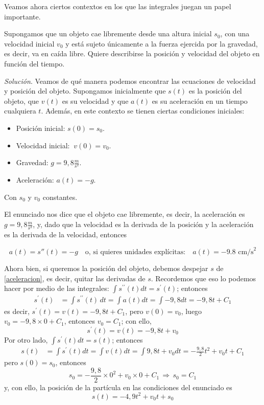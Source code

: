 Veamos ahora ciertos contextos en los que las integrales juegan un papel importante.

\begin{ejemplo}
\textnormal{Supongamos que un objeto cae libremente desde una altura inicial \textit{$s_{0}$}, con una velocidad inicial \textit{$v_{0}$} y está sujeto únicamente a la fuerza ejercida por la gravedad, es decir, va en caída libre. Quiere describirse la posición y velocidad del objeto en función del tiempo.}
\end{ejemplo}

\textit{Solución}. Veamos de qué manera podemos encontrar las ecuaciones de velocidad y posición del objeto. Supongamos inicialmente que $s(t)$ es la posición del objeto, que $v(t)$ es su velocidad y que $a(t)$ es su aceleración en un tiempo cualquiera $t$. Además, en este contexto se tienen ciertas condiciones iniciales:

\begin{itemize}
 \item Posición inicial: $s(0)=s_{0}$.
 \item Velocidad inicial: $\ v(0)=v_{0}$.
 \item Gravedad: $g=9,8\frac{m}{s^{2}}$.
 \item Aceleración: $a(t)=-g$.
\end{itemize}
Con $s_0$ y $v_0$ constantes.


El enunciado nos dice que el objeto cae libremente, es decir, la aceleración es $g=9,8\frac{m}{s^{2}}$, y, dado que la velocidad es la derivada de la posición y la aceleración es la derivada de la velocidad, entonces

{\small
\begin{equation}\label{aceleracion}
	a(t)=s''(t)=-g \quad \text{o, si quieres unidades explícitas:} \quad a(t)=-9.8\text{ cm/s}^2
\end{equation}
}

Ahora bien, si queremos la posición del objeto, debemos despejar $s$ de \eqref{aceleracion}, es decir, quitar las derivadas de $s$. Recordemos que eso lo podemos hacer por medio de las integrales: $\displaystyle{\int s^{\prime \prime} (t)dt=s^\prime (t)}$; entonces
\begin{align*}
s^\prime (t)&=\int s^{\prime \prime} (t)\,dt=\int a(t)dt=\int -9,8dt=-9,8 t+C_1
\end{align*}
es decir, $s^\prime(t)=v(t)=-9,8t+C_1$, pero $v(0)=v_{0}$, luego $v_0=-9,8\times 0+C_1$, entonces $v_0=C_1$; con ello,
\[
s^\prime(t)=v(t)=-9,8t+v_0
\]
Por otro lado, $\displaystyle{\int s^\prime (t)dt=s(t)}$; entonces
\begin{align*}
s(t)&=\int s^\prime (t)dt=\int v(t)dt=\int 9,8t+v_{0}dt=-\frac{9,8}{2}t^{2}+v_{0}t+C_1
\end{align*}
pero $s(0)=s_0$, entonces
\[
s_0=-\frac{9,8}{2}\times 0^{2}+v_{0}\times 0+C_1\, \Rightarrow \, s_0=C_1
\]
y, con ello, la posición de la partícula en las condiciones del enunciado es
\begin{equation}\label{posicion}
s(t)=-4,9t^{2}+v_{0}t+s_{0} 
\end{equation}

